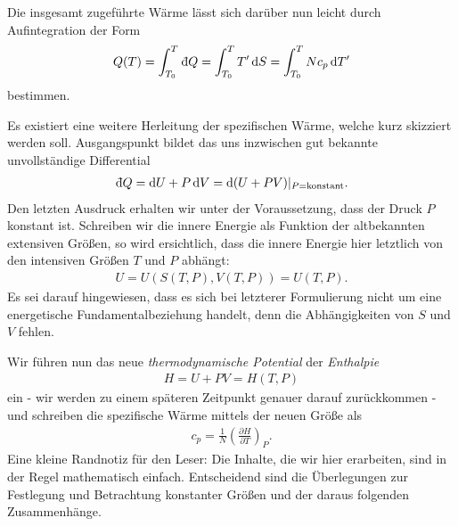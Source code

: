 Die insgesamt zugeführte Wärme lässt sich darüber nun leicht durch Aufintegration der Form
\begin{align*}
    Q(T)=\int_{T_0}^{T} \udiff Q = \int_{T_0}^{T}T' \diff S = \int_{T_0}^{T}Nc_p\diff T'
\end{align*} 
bestimmen. 

Es existiert eine weitere Herleitung der spezifischen Wärme, welche kurz skizziert werden soll. Ausgangspunkt bildet das uns inzwischen gut bekannte unvollständige Differential 
\begin{align*}
    \udiff Q=\diff U +P\diff V= \diff(U+PV)|_{P=\text{konstant}}.
\end{align*}
Den letzten Ausdruck erhalten wir unter der Voraussetzung, dass der Druck $P$ konstant ist. Schreiben wir die innere Energie als Funktion der altbekannten extensiven Größen, so wird ersichtlich, dass die innere Energie hier letztlich von den intensiven Größen $T$ und $P$ abhängt:
\begin{align*}
    U=U(S(T,P),V(T,P))=U(T,P).
\end{align*}
Es sei darauf hingewiesen, dass es sich bei letzterer Formulierung nicht um eine energetische Fundamentalbeziehung handelt, denn die Abhängigkeiten von $S$ und $V$ fehlen.


Wir führen nun das neue \emph{thermodynamische Potential} der \emph{Enthalpie} 
\begin{align*}
    \boxed{H=U+PV=H(T,P)}
\end{align*} 
ein - wir werden zu einem späteren Zeitpunkt genauer darauf zurückkommen - und schreiben die spezifische Wärme mittels der neuen Größe als 
\begin{align*}
    c_p=\frac{1}{N}\left( \frac{\partial H}{\partial T}\right)_P.
\end{align*} 
Eine kleine Randnotiz für den Leser: Die Inhalte, die wir hier erarbeiten, sind in der Regel mathematisch einfach. Entscheidend sind die Überlegungen zur Festlegung und Betrachtung konstanter Größen und der daraus folgenden Zusammenhänge.


